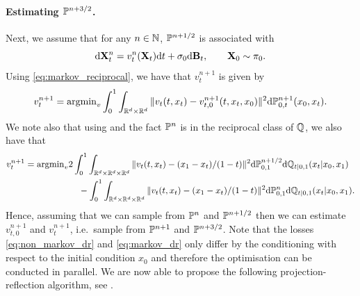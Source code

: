\documentclass{article}
\begin{document}
\paragraph{Estimating $\mathbb{P}^{n+3/2}$.} Next, we assume that for any $n \in \mathbb{N}$, $\mathbb{P}^{n+1/2}$ is associated with 
\begin{equation}
    \mathrm{d} \mathbf{X}_t^n = v_t^n(\mathbf{X}_t) \mathrm{d} t + \sigma_0 \mathrm{d} \mathbf{B}_t , \qquad \mathbf{X}_0 \sim \pi_0 . 
\end{equation}
Using \eqref{eq:markov_reciprocal}, we have that $v_t^{n+1}$ is given by 
\begin{equation}
     v_t^{n+1} = \mathrm{argmin}_{v} \int_0^1 \int_{\mathbb{R}^d \times \mathbb{R}^d} \| v_t(t, x_t) - v_{t,0}^{n+1}(t, x_t, x_0) \|^2 \mathrm{d} \mathbb{P}^{n+1}_{0,t}(x_0, x_t) . 
\end{equation}
We note also that using \cite[Proposition 2]{shi2023DSBM} and the fact $\mathbb{P}^n$ is in the reciprocal class of $\mathbb{Q}$, we also have that  
\begin{align}
v_t^{n+1} &=   \argmin_{v} 2 \int_0^1 \int_{\rset^d \times \rset^d \times \rset^d} \| v_{t}(t, x_t) - (x_1 - x_t)/(1-t) \|^2 \rmd \Pbb^{n+1/2}_{0,1} \rmd \Qbb_{t|0,1}(x_t|x_0,x_1) \\
    &\qquad \qquad \qquad     - \int_0^1 \int_{\rset^d \times \rset^d \times \rset^d} \| v_{t}(t, x_t) - (x_1 - x_t)/(1-t) \|^2 \rmd \Pbb^{n}_{0,1} \rmd \Qbb_{t|0,1}(x_t|x_0,x_1) . \label{eq:markov_dr}
\end{align}
Hence, assuming that we can sample from $\mathbb{P}^n$ and $\mathbb{P}^{n+1/2}$ then we can estimate $v_{t,0}^{n+1}$ and $v_t^{n+1}$, i.e.~sample from $\mathbb{P}^{n+1}$ and $\mathbb{P}^{n+3/2}$. Note that the losses \eqref{eq:non_markov_dr} and \eqref{eq:markov_dr} only differ by the conditioning with respect to the initial condition $x_0$ and therefore the optimisation can be conducted in parallel. We are now able to propose the following projection-reflection algorithm, see .
\end{document}
